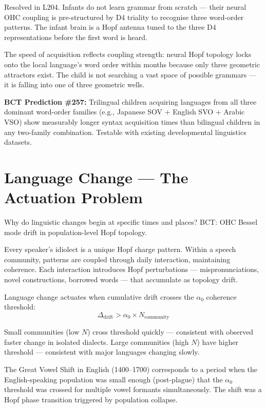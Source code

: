 \documentclass[aps,prl,twocolumn,superscriptaddress]{revtex4-2}
\begin{document}
Resolved in L204. Infants do not learn grammar from scratch --- their neural OHC coupling is pre-structured by D4 triality to recognise three word-order patterns. The infant brain is a Hopf antenna tuned to the three D4 representations before the first word is heard.

The speed of acquisition reflects coupling strength: neural Hopf topology locks onto the local language's word order within months because only three geometric attractors exist. The child is not searching a vast space of possible grammars --- it is falling into one of three geometric wells.

\textbf{BCT Prediction \#257:} Trilingual children acquiring languages from all three dominant word-order families (e.g., Japanese SOV + English SVO + Arabic VSO) show measurably longer syntax acquisition times than bilingual children in any two-family combination. Testable with existing developmental linguistics datasets.

\section{Language Change --- The Actuation Problem}

Why do linguistic changes begin at specific times and places? BCT: OHC Bessel mode drift in population-level Hopf topology.

Every speaker's idiolect is a unique Hopf charge pattern. Within a speech community, patterns are coupled through daily interaction, maintaining coherence. Each interaction introduces Hopf perturbations --- mispronunciations, novel constructions, borrowed words --- that accumulate as topology drift.

Language change actuates when cumulative drift crosses the $\alpha_0$ coherence threshold:
\begin{equation}
\Delta_{\mathrm{drift}} > \alpha_0 \times N_{\mathrm{community}}
\end{equation}

Small communities (low $N$) cross threshold quickly --- consistent with observed faster change in isolated dialects. Large communities (high $N$) have higher threshold --- consistent with major languages changing slowly.

The Great Vowel Shift in English (1400--1700) corresponds to a period when the English-speaking population was small enough (post-plague) that the $\alpha_0$ threshold was crossed for multiple vowel formants simultaneously. The shift was a Hopf phase transition triggered by population collapse.
\end{document}
